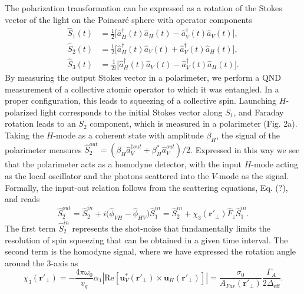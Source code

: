 \documentclass[preprint,aps,pra,onecolumn,superscriptaddress]{revtex4-1} %
\newcommand{\mbf}[1]{\mathbf{#1}}
\newcommand{\smallfrac}[2]{\mbox{$\frac{#1}{#2}$}}
\newcommand{\eff}{\text{eff}}
\newcommand{\Poincare}{Poincar\'e\xspace}
\begin{document}
The polarization transformation can be expressed as a rotation of the Stokes vector of the light on the \Poincare sphere with operator components
\begin{subequations}\label{Eq::StokesComponents}
	\begin{align}
		\hat{S}_1(t) & = \smallfrac{1}{2}\big[ \hat{a}^\dag_H(t) \hat{a}_H(t)-\hat{a}^\dag_V(t) \hat{a}_V(t) \big], \\
	 	\hat{S}_2(t) & = \smallfrac{1}{2}\big[ \hat{a}^\dag_H(t) \hat{a}_V(t)+\hat{a}^\dag_V(t) \hat{a}_H(t) \big], \\ 
		\hat{S}_3(t) & = \smallfrac{1}{2i}\big[ \hat{a}^\dag_H(t) \hat{a}_V(t) -\hat{a}^\dag_V(t) \hat{a}_H(t) \big].
	\end{align}
\end{subequations}
By measuring the output Stokes vector in a polarimeter, we perform a QND measurement of a collective atomic operator to which it was entangled.  In a proper configuration, this leads to squeezing of a collective spin.  Launching $H$-polarized light corresponds to the initial Stokes vector along $S_1$, and Faraday rotation leads to an $S_2$ component, which is measured in a polarimeter (Fig. 2a).  Taking the $H$-mode as a coherent state with amplitude $\beta_H$, the signal of the polarimeter measures $\hat{S}_2^{out} = (\beta_H \hat{a}_V^{\dag out} +\beta^*_H \hat{a}_V^{out})/2$.  Expressed in this way we see that the polarimeter acts as a homodyne detector, with the input $H$-mode acting as the local oscillator and the photons scattered into the $V$-mode as the signal.  Formally, the input-out relation follows from the scattering equations, Eq. (?), and reads
\begin{equation}
\hat{S}^{out}_2 = \hat{S}^{in}_2 +i \big( \hat{\phi}_{VH}- \hat{\phi}_{HV} \big) \hat{S}^{in}_1 =  \hat{S}^{in}_2 + \chi_3(\mbf{r}'_\perp) \hat{F}_z \hat{S}^{in}_1.
\end{equation}
The first term $\hat{S}^{in}_2$ represents the shot-noise that fundamentally limits the resolution of spin squeezing that can be obtained in a given time interval.  The second term is the homodyne signal, where we have expressed the rotation angle around the 3-axis as
\begin{equation}
\chi_3(\mbf{r}'_\perp) = -\frac{4 \pi \omega_0}{v_g} \alpha_1 \left\vert \text{Re} \left[ \mbf{u}^*_V (\mbf{r}'_\perp) \times \mbf{u}_H (\mbf{r}'_\perp) \right] \right\vert = \frac{\sigma_0}{A_{Far}(\mbf{r}'_\perp)} \frac{\Gamma_A}{2 \Delta_{\eff}}.
\end{equation}
\end{document}
